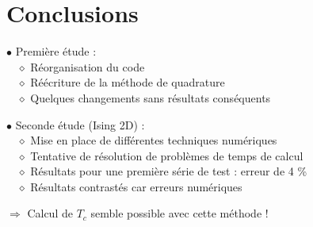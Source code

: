 \documentclass[9pt]{beamer}
\begin{document}
	
	\section{Conclusions}
	
	\sommaire{}
	
		\begin{frame}
	\justifying
	\vspace*{22pt}
	
	$\bullet$ Première étude : \\
	\vspace*{5pt}
		$\quad \diamond$ Réorganisation du code \\
		$\quad \diamond$ Réécriture de la méthode de quadrature \\
		$\quad \diamond$ Quelques changements sans résultats conséquents\\
	
	\vspace*{15pt}
	
	$\bullet$ Seconde étude (Ising 2D) : \\
		\vspace*{5pt}
	$\quad \diamond$ Mise en place de différentes techniques numériques\\
	$\quad \diamond$ Tentative de résolution de problèmes de temps de calcul\\
	$\quad \diamond$ Résultats pour une première série de test : erreur de 4 \%\\
	$\quad \diamond$ Résultats contrastés car erreurs numériques \\
	
		\vspace*{15pt}
	
	
	$\Rightarrow$ Calcul de $T_c$ semble possible avec cette méthode !
	
	\end{frame}
	
	
\end{document}
